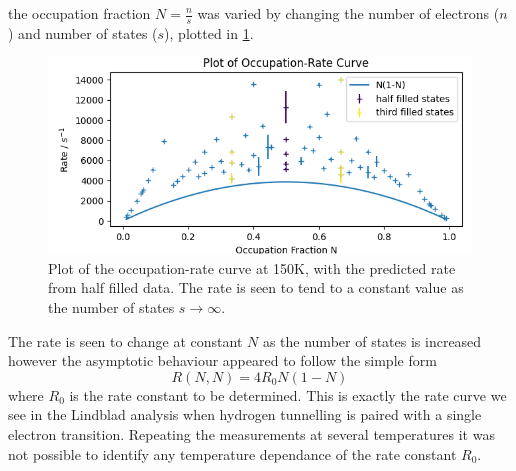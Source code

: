 the occupation fraction
\(N = \frac{n}{s}\) was
varied by changing the
number of electrons (\(n\))
and number of states (\(s\)),
plotted in
\cref{fig:occupation rate curve}.
\begin{figure}
    \centering
    \includegraphics[width=0.7\linewidth]{Figures/Simulation/Occupation Rate Curve.png}
    \caption{Plot of the occupation-rate curve
        at 150K, with the predicted rate from half
        filled data. The rate is seen to
        tend to a constant
        value as the number of states
        \(s\rightarrow{}\infty{}\).
    }\label{fig:occupation rate curve}
\end{figure}
The rate is seen to change
at constant \(N\) as the
number of states is
increased however the asymptotic
behaviour appeared to follow the
simple form
\begin{equation}
    R(N,N) = 4 R_0 N(1-N)\label{eqn:degenerate tunnelling rate}
\end{equation}
where \(R_0\) is the
rate constant to be determined.
This is exactly the rate curve
we see in the Lindblad
analysis when hydrogen tunnelling
is paired with a single
electron transition.
Repeating the measurements at several
temperatures it was not possible
to identify any
temperature dependance of the
rate constant \(R_0\).


